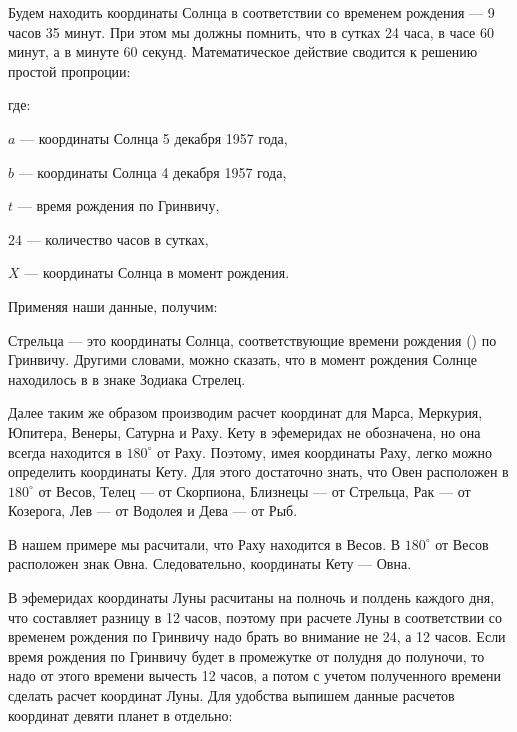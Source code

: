 Будем находить координаты Солнца в соответствии со временем рождения --- 9 часов 35 минут. При этом мы должны помнить, что в сутках 24 часа, в часе 60 минут, а в минуте 60 секунд. Математическое действие сводится к решению простой пропроции:

 где:

\begin{mylist}[topsep=0]
	\item $a$ --- координаты Солнца 5 декабря 1957 года,
	\item $b$ --- координаты Солнца 4 декабря 1957 года,
	\item $t$ --- время рождения по Гринвичу,
	\item $24$ --- количество часов в сутках,
	\item $X$ --- координаты Солнца в момент рождения.
\end{mylist}

{\parindent=0pt Применяя наши данные, получим:}

Стрельца --- это координаты Солнца, соответствующие времени рождения () по Гринвичу. Другими словами, можно сказать, что в момент рождения Солнце находилось в  в знаке Зодиака Стрелец.

Далее таким же образом производим расчет координат для Марса, Меркурия, Юпитера, Венеры, Сатурна и Раху. Кету в эфемеридах не обозначена, но она всегда находится в $180^\circ$ от Раху. Поэтому, имея координаты Раху, легко можно определить координаты Кету. Для этого достаточно знать, что Овен расположен в $180^\circ$ от Весов, Телец --- от Скорпиона, Близнецы --- от Стрельца, Рак --- от Козерога, Лев --- от Водолея и Дева --- от Рыб.

В нашем примере мы расчитали, что Раху находится в  Весов. В $180^\circ$ от Весов расположен знак Овна. Следовательно, координаты Кету ---  Овна.

В эфемеридах координаты Луны расчитаны на полночь и полдень каждого дня, что составляет разницу в 12 часов, поэтому при расчете Луны в соответствии со временем рождения по Гринвичу надо брать во внимание не 24, а 12 часов. Если время рождения по Гринвичу будет в промежутке от полудня до полуночи, то надо от этого времени вычесть 12 часов, а потом с учетом полученного времени сделать расчет координат Луны. Для удобства выпишем данные расчетов координат девяти планет в отдельно:

